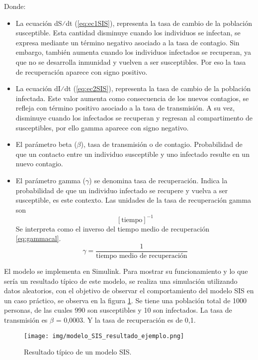 Donde:
\begin{itemize}
    \item 	La ecuación dS⁄dt (\ref{eq:ec1SIS}), representa la tasa de cambio de la población susceptible. Esta cantidad disminuye cuando los individuos se infectan, se expresa mediante un término negativo asociado a la tasa de contagio. Sin embargo, también aumenta cuando los individuos infectados se recuperan, ya que no se desarrolla inmunidad y vuelven a ser susceptibles. Por eso la tasa de recuperación aparece con signo positivo.
    \item 	La ecuación dI⁄dt (\ref{eq:ec2SIS}), representa la tasa de cambio de la población infectada. Este valor aumenta como consecuencia de los nuevos contagios, se refleja con término positivo asociado a la tasa de transmisión. A su vez, disminuye cuando los infectados se recuperan y regresan al compartimento de susceptibles, por ello gamma aparece con signo negativo.
    \item 	El parámetro beta ($\beta$), tasa de transmisión o de contagio. Probabilidad de que un contacto entre un individuo susceptible y uno infectado resulte en un nuevo contagio. 
    \item 	El parámetro gamma ($\gamma$) se denomina tasa de recuperación. Indica la probabilidad de que un individuo infectado se recupere y vuelva a ser susceptible, es este contexto. Las unidades de la tasa de recuperación gamma son \[[\text{tiempo}]^{-1}\]  Se interpreta como el inverso del tiempo medio de recuperación \eqref{eq:gammacal}.
    \begin{equation}
    \gamma = \frac{1}{\text{tiempo medio de recuperación}}
    \label{eq:gammacal}
    \end{equation}
\end{itemize}


El modelo se implementa en Simulink. Para mostrar su funcionamiento y lo que sería un resultado típico de este modelo, se realiza una simulación utilizando datos aleatorios, con el objetivo de observar el comportamiento del modelo SIS en un caso práctico, se observa en la figura \ref{fig:ejeSIS}. Se tiene una población total de 1000 personas, de las cuales 990 son susceptibles y 10 son infectados. La tasa de transmisión es $\beta$ = 0,0003. 
Y la tasa de recuperación es de 0,1.



\begin{figure}[H]
    \centering
    \texttt{[image: img/modelo\_SIS\_resultado\_ejemplo.png]}
    \caption{Resultado típico de un modelo SIS.}
    \label{fig:ejeSIS}
    \vspace{0.5cm} %
\end{figure}


